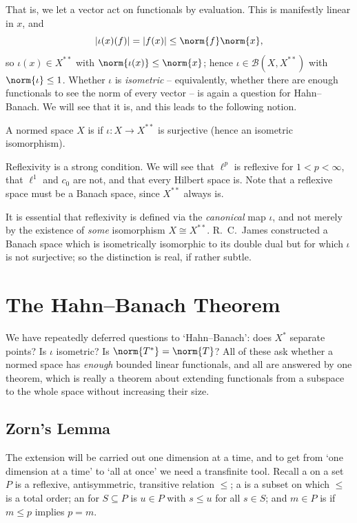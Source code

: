 \documentclass[a4paper]{scrartcl}
\newcommand{\Bop}{\mathcal{B}}
\begin{document}
That is, we let a vector act on functionals by evaluation. This is manifestly linear in $x$, and
$$|\iota(x)(f)| = |f(x)| \leq \norm{f}\norm{x},$$
so $\iota(x) \in X^{**}$ with $\norm{\iota(x)} \leq \norm{x}$; hence $\iota \in \Bop(X, X^{**})$ with $\norm{\iota} \leq 1$. Whether $\iota$ is \emph{isometric} -- equivalently, whether there are enough functionals to see the norm of every vector -- is again a question for Hahn--Banach. We will see that it is, and this leads to the following notion.

\begin{definition}[Reflexive]
	A normed space $X$ is  if $\iota : X \to X^{**}$ is surjective (hence an isometric isomorphism).
\end{definition}

Reflexivity is a strong condition. We will see that $\ell^p$ is reflexive for $1 < p < \infty$, that $\ell^1$ and $c_0$ are not, and that every Hilbert space is. Note that a reflexive space must be a Banach space, since $X^{**}$ always is.

\begin{remark}
	It is essential that reflexivity is defined via the \emph{canonical} map $\iota$, and not merely by the existence of \emph{some} isomorphism $X \cong X^{**}$. R.\ C.\ James constructed a Banach space which is isometrically isomorphic to its double dual but for which $\iota$ is not surjective; so the distinction is real, if rather subtle.
\end{remark}

\section{The Hahn--Banach Theorem}

We have repeatedly deferred questions to `Hahn--Banach': does $X^*$ separate points? Is $\iota$ isometric? Is $\norm{T^*} = \norm{T}$? All of these ask whether a normed space has \emph{enough} bounded linear functionals, and all are answered by one theorem, which is really a theorem about extending functionals from a subspace to the whole space without increasing their size.

\subsection{Zorn's Lemma}

The extension will be carried out one dimension at a time, and to get from `one dimension at a time' to `all at once' we need a transfinite tool. Recall a  on a set $P$ is a reflexive, antisymmetric, transitive relation $\leq$; a  is a subset on which $\leq$ is a total order; an  for $S \subseteq P$ is $u \in P$ with $s \leq u$ for all $s \in S$; and $m \in P$ is  if $m \leq p$ implies $p = m$.
\end{document}
